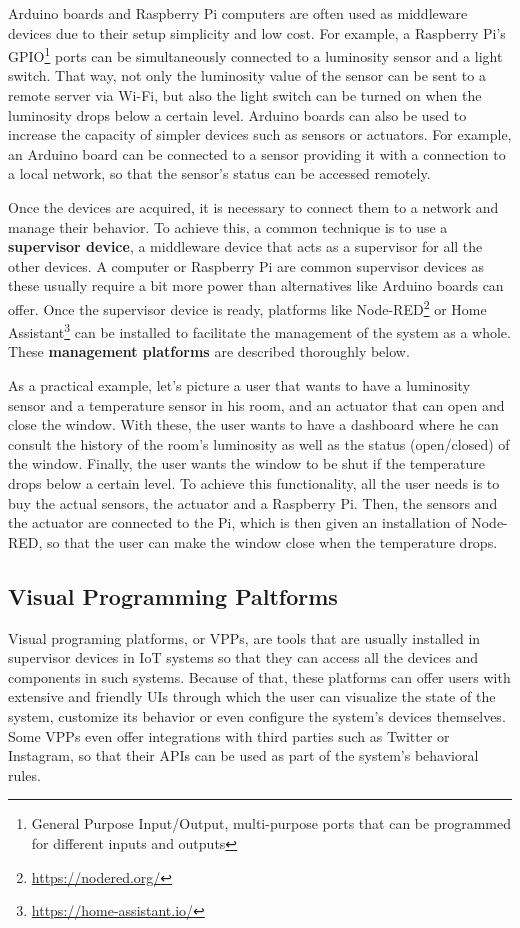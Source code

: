 \documentclass[runningheads]{llncs}
\begin{document}
Arduino boards and Raspberry Pi computers are often used as middleware devices due to their setup simplicity and low cost. For example, a Raspberry Pi’s GPIO\footnote{General Purpose Input/Output, multi-purpose ports that can be programmed for different inputs and outputs} ports can be simultaneously connected to a luminosity sensor and a light switch. That way, not only the luminosity value of the sensor can be sent to a remote server via Wi-Fi, but also the light switch can be turned on when the luminosity drops below a certain level. Arduino boards can also be used to increase the capacity of simpler devices such as sensors or actuators. For example, an Arduino board can be connected to a sensor providing it with a connection to a local network, so that the sensor’s status can be accessed remotely.

Once the devices are acquired, it is necessary to connect them to a network and manage their behavior. To achieve this, a common technique is to use a \textbf{supervisor device}, a middleware device that acts as a supervisor for all the other devices. A computer or Raspberry Pi are common supervisor devices as these usually require a bit more power than alternatives like Arduino boards can offer. Once the supervisor device is ready, platforms like Node-RED\footnote{\url{https://nodered.org/}} or Home Assistant\footnote{\url{https://home-assistant.io/}} can be installed to facilitate the management of the system as a whole. These \textbf{management platforms} are described thoroughly below.

As a practical example, let’s picture a user that wants to have a luminosity sensor and a temperature sensor in his room, and an actuator that can open and close the window. With these, the user wants to have a dashboard where he can consult the history of the room’s luminosity as well as the status (open/closed) of the window. Finally, the user wants the window to be shut if the temperature drops below a certain level. To achieve this functionality, all the user needs is to buy the actual sensors, the actuator and a Raspberry Pi. Then, the sensors and the actuator are connected to the Pi, which is then given an installation of Node-RED, so that the user can make the window close when the temperature drops.

\subsection{Visual Programming Paltforms}

Visual programing platforms, or VPPs, are tools that are usually installed in supervisor devices in IoT systems so that they can access all the devices and components in such systems. Because of that, these platforms can offer users with extensive and friendly UIs through which the user can visualize the state of the system, customize its behavior or even configure the system’s devices themselves. Some VPPs even offer integrations with third parties such as Twitter or Instagram, so that their APIs can be used as part of the system’s behavioral rules.
\end{document}
